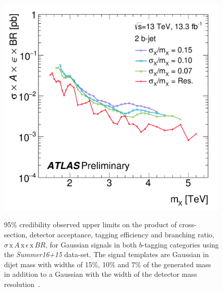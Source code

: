 \begin{figure}[!ht]
  \begin{center}
    \captionsetup[subfigure]{aboveskip=0pt,justification=centering}
         {\includegraphics[width=0.49\linewidth, angle=0]{figs/Dibjet/ICHEP/lim-summer_gauss_bb.pdf}}
  \end{center}
  \vspace{-1em}
  \caption[95\% credibility observed upper limits
    on the product of cross-section, detector acceptance, tagging efficiency and branching ratio
    for Gaussian signals using the \textit{Summer16+15} data-set.]
  {95\% credibility observed upper limits
    on the product of cross-section, detector acceptance, tagging efficiency and branching ratio,
    $\sigma\,\text{x}\,\mathit{A}\,\text{x}\,\epsilon\,\text{x}\,\mathit{BR}$,
    for Gaussian signals in both $b$-tagging categories using the \textit{Summer16+15} data-set.
    The signal templates are Gaussian in dijet  mass with
    widths of 15\%, 10\% and 7\% of the generated mass
    in addition to a Gaussian with the width of the detector mass resolution~\cite{dibjet-ichep_conf}.
  }
  \label{fig:lim-summer_gauss}
\end{figure}

